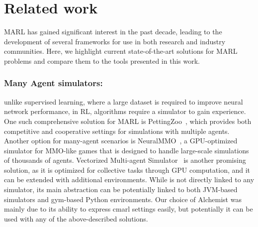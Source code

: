 \section{Related work}\label{coordination2023:sec:related}
MARL has gained significant interest in the past decade, 
 leading to the development of several frameworks 
 for use in both research and industry communities. 
Here, we highlight current state-of-the-art solutions 
 for MARL problems and compare 
 them to the tools presented in this work.
\subsubsection{Many Agent simulators:}   
unlike supervised learning, 
 where a large dataset is required to improve neural network performance, 
 in RL, algorithms require a simulator to gain experience. 
One such comprehensive solution for MARL is PettingZoo~\cite{NEURIPS2021_7ed2d345}, 
 which provides both competitive and cooperative settings 
 for simulations with multiple agents. 
%
Another option for many-agent scenarios is NeuralMMO~\cite{https://doi.org/10.48550/arxiv.1903.00784}, 
 a GPU-optimized simulator for MMO-like games 
 that is designed to handle large-scale simulations of thousands of agents.
% 
Vectorized Multi-agent Simulator~\cite{bettini2022vmas} is another promising solution, 
 as it is optimized for collective tasks through GPU computation, 
 and it can be extended with additional environments.
%
While \scarlib is not directly linked to any simulator, 
 its main abstraction can be potentially linked 
 to both JVM-based simulators and gym-based Python environments. 
 Our choice of Alchemist was mainly due to its ability to express \ac{cmarl} settings easily, but potentially it can be used with any of the above-described solutions.
